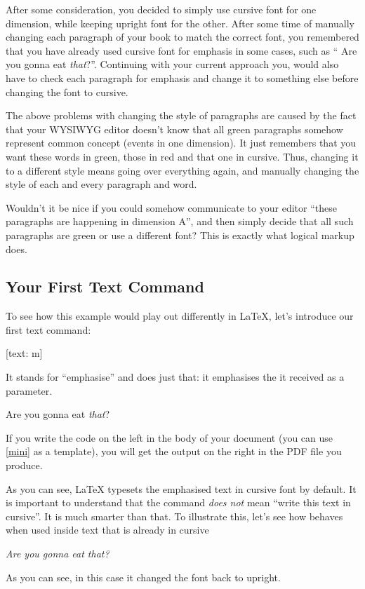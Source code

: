 After some consideration, you decided to simply use cursive font for one
dimension, while keeping upright font for the other. After some time of manually
changing each paragraph of your book to match the correct font, you remembered
that you have already used cursive font for emphasis in some cases, such as
\enquote{{\color[HTML]{2E7D32} Are you gonna eat \emph{that}?}}. Continuing
with your current approach you, would also have to check each paragraph for
emphasis and change it to something else before changing the font to cursive.

The above problems with changing the style of paragraphs are caused by the fact
that your WYSIWYG editor doesn't know that all green paragraphs somehow
represent common concept (events in one dimension). It just remembers that you
want these words in green, those in red and that one in cursive. Thus, changing
it to a different style means going over everything again, and manually changing
the style of each and every paragraph and word.

Wouldn't it be nice if you could somehow communicate to your editor
\enquote{these paragraphs are happening in dimension A}, and then simply decide
that all such paragraphs are green or use a different font? This is exactly
what logical markup does.

\subsection{Your First Text Command}

To see how this example would play out differently in \LaTeX{}, let's introduce
our first text command:
\begin{lscommand}
  [text: m]
\end{lscommand}
It stands for \enquote{emphasise} and does just that: it emphasises the
 it received as a parameter.
\begin{example}
Are you gonna eat \emph{that}?
\end{example}
If you write the code on the left in the body of your document (you can use
\autoref{mini} as a template), you will get the output on the right in the
PDF file you produce.

As you can see, \LaTeX{} typesets the emphasised text in cursive font by
default. It is important to understand that the  command
\emph{does not} mean \enquote{write this text in cursive}. It is much smarter
than that. To illustrate this, let's see how  behaves when used inside
text that is already in cursive
\begin{example}
  \itshape%
Are you gonna eat \emph{that}?
\end{example}
As you can see, in this case it changed the font back to upright.

